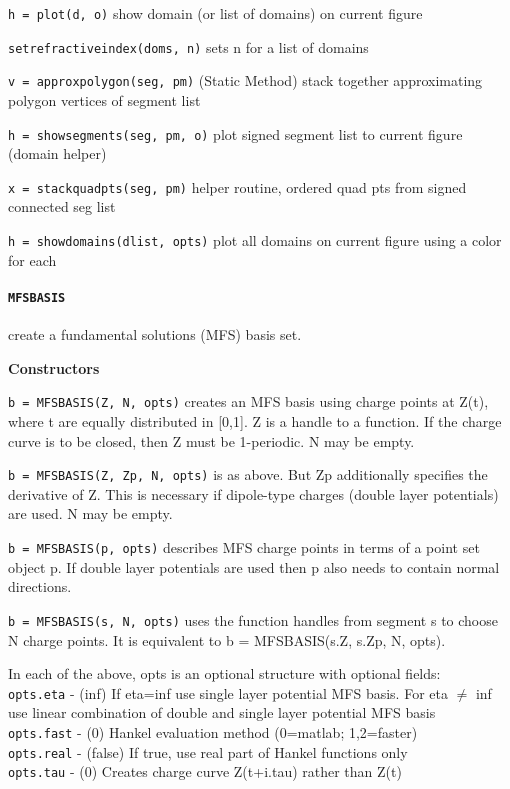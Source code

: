 {\tt h = plot(d, o)} show domain (or list of domains) on current figure

{\tt setrefractiveindex(doms, n)} sets n for a list of domains

{\tt v = approxpolygon(seg, pm)} (Static Method) stack together
approximating polygon vertices of segment list

{\tt h = showsegments(seg, pm, o)} plot signed segment list to
current figure (domain helper)

{\tt x = stackquadpts(seg, pm)} helper routine, ordered quad pts
from signed connected seg list 

{\tt h = showdomains(dlist, opts)} plot all domains on current
figure using a color for each

\newpage

\paragraph{\tt MFSBASIS} create a fundamental solutions (MFS) basis
set.

\textbf{Constructors}

{\tt b = MFSBASIS(Z, N, opts)} creates an MFS basis using charge points
    at Z(t), where t are equally distributed in [0,1]. Z is a handle
   to a function. If the charge curve is to be closed, then Z must be
   1-periodic. N may be empty.

{\tt b = MFSBASIS({Z, Zp}, N, opts)} is as above. But Zp additionally specifies
   the derivative of Z. This is necessary if dipole-type charges (double
   layer potentials) are used. N may be empty.

{\tt b = MFSBASIS(p, opts)} describes MFS charge points in terms of a point
   set object p. If double layer potentials are used then p also needs to
   contain normal directions.

{\tt b = MFSBASIS(s, N, opts)} uses the function handles from segment s to choose
   N charge points. It is equivalent to b = MFSBASIS({s.Z, s.Zp}, N, opts).

  In each of the above, opts is an optional structure with optional fields:\\
  {\tt opts.eta}   - (inf) If eta=inf use single layer potential MFS basis. For
               eta $\neq$ inf use linear combination of double and single layer
               potential MFS basis\\
  {\tt opts.fast}  - (0) Hankel evaluation method (0=matlab; 1,2=faster)\\
  {\tt opts.real}  - (false) If true, use real part of Hankel functions only\\
  {\tt opts.tau}   - (0) Creates charge curve Z(t+i.tau) rather than Z(t)\\

